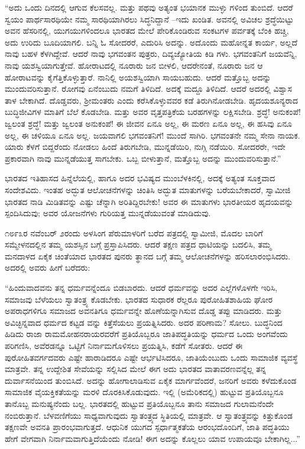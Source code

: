 “ಅದು ಒಂದು ದಿನದಲ್ಲಿ ಆಗುವ ಕೆಲಸವಲ್ಲ. ಮತ್ತು ಪಥವು ಅತ್ಯಂತ ಭಯಾನಕ ಮುಳ್ಳು ಗಳಿಂದ ತುಂಬಿದೆ. ಆದರೆ ಸ್ವಯಂ ಪಾರ್ಥಸಾರಥಿಯೇ ನಮ್ಮ ಸಾರಥಿಯಾಗಿರಲು ಸಿದ್ಧನಿದ್ದಾನೆ –ಇದು ಖಂಡಿತ. ಅವನಲ್ಲಿ ಅವಿಚಲ ಶ್ರದ್ಧೆಯಿಟ್ಟು ಅವನ ಹೆಸರಿನಲ್ಲಿ, ಯುಗಯುಗಳಿಂದಲೂ ಭಾರತದ ಮೇಲೆ ಪೇರಿಕೊಂಡಿರುವ ಸಂಕಟಗಳ ಪರ್ವತಕ್ಕೆ ಬೆಂಕಿ ಹಚ್ಚಿ, ಅದು ಉರಿದು ಬೂದಿಯಾಗಲಿ. ಬನ್ನಿ ಓ ಸೋದರರೆ, ಎದುರಿಸಿ ಅದನ್ನು. ಅದೊಂದು ಮಹೋನ್ನತ ಕಾರ್ಯ, ಅಲ್ಲದೆ ನಾವು ಬಹಳ ಕೆಳಗಿದ್ದೇವೆ. ಆದರೆ ನಾವು ಭಗವಂತನ ಪುತ್ರರು, ದಿವ್ಯಜ್ಯೋತಿಯ ಕಿಡಿ ಗಳು. ಭಗವಂತನಿಗೆ ಜಯವೆನ್ನಿ, ನಾವು ಯಶಸ್ವಿಯಾಗುತ್ತೇವೆ. ಹೋರಾಟದಲ್ಲಿ ನೂರಾರು ಜನ ಬೀಳಲಿ, ಆದರೇನಂತೆ, ನೂರಾರು ಜನ ಆ ಹೋರಾಟವನ್ನು ಕೈಗೆತ್ತಿಕೊಳ್ಳುತ್ತಾರೆ. ನಾನಿಲ್ಲಿ ಅಯಶಸ್ವಿಯಾಗಿ ಸಾಯಬಹುದು. ಆದರೆ ಮತ್ತೊಬ್ಬ ಅದನ್ನು ಮುಂದುವರಿಸುತ್ತಾನೆ. ರೋಗವು ಏನೆಂಬುದು ನಮಗೆ ತಿಳಿದಿದೆ. ಅದಕ್ಕೆ ಮದ್ದೂ ತಿಳಿದಿದೆ. ಆದರೆ ಅದರಲ್ಲಿ ವಿಶ್ವಾಸ ತಾಳ ಬೇಕಾಗಿದೆ. ದೊಡ್ಡವರು, ಶ್ರೀಮಂತರು ಎಂದು ಕರೆಸಿಕೊಳ್ಳುವವರ ಕಡೆ ತಿರುಗಿನೋಡಬೇಡಿ. ಹೃದಯಶೂನ್ಯರಾದ ಬುದ್ಧಿಜೀವಿಗಳ ಮಾತಿಗೆ ಬೆಲೆ ಕೊಡಬೇಡಿ. ಮತ್ತು ಅವರ ವೃತ್ತಪತ್ರಿಕೆಯ ಬರಹಗಳನ್ನು ಲಕ್ಷಿಸಬೇಡಿ. ಶ್ರದ್ಧೆ! ಅನುಕಂಪೆ! ಜ್ವಲಂತ ಶ್ರದ್ಧೆ! ಮತ್ತು ಜ್ವಲಂತ ಅನುಕಂಪೆ! ಈ ಜೀವನ ಏನೂ ಅಲ್ಲ, ಈ ಮರಣ ಏನೂ ಅಲ್ಲ, ಈ ಹಸಿವು ಏನೂ ಅಲ್ಲ, ಈ ಚಳಿಯೂ ಏನೂ ಅಲ್ಲ. ಜಯವಾಗಲಿ ಭಗವಂತನಿಗೆ! ಮುಂದೆ ಸಾಗಿರಿ. ಭಗವಂತನೇ ನಮ್ಮ ಸೇನಾ ನಾಯಕ. ಯಾರು ಕೆಳಗೆ ಬಿದ್ದರೆಂದು ನೋಡಲು ಹಿಂದೆ ತಿರುಗಬೇಡಿ, ಮುನ್ನಡೆಯಿರಿ, ನುಗ್ಗಿ ನಡೆಯಿರಿ. ಸೋದರರೇ, ಇದೇ ಪ್ರಕಾರವಾಗಿ ನಾವು ಮುನ್ನಡೆಯುತ್ತ ಸಾಗಬೇಕು. ಒಬ್ಬ ಬೀಳುತ್ತಾನೆ, ಮತ್ತೊಬ್ಬ ಅದನ್ನು ಮುಂದುವರಿಸುತ್ತಾನೆ.”

ಭಾರತದ ಇತಿಹಾಸದ ಹಿನ್ನೆಲೆಯಲ್ಲಿ, ಹಾಗೂ ಅದರ ಭವಿಷ್ಯದ ಮುಂಬೆಳಕಿನಲ್ಲಿ, ಅದಕ್ಕೆ ಅತ್ಯಂತ ಸೂಕ್ತವಾದ ಸಂದೇಶವಿದು. ಇಂತಹ ಅದ್ಭುತ ಆಲೋಚನೆಗಳನ್ನು ಚಿಂತಿಸಿ ಅದ್ಭುತ ಮಾತುಗಳನ್ನು ಬರೆಯಬೇಕಾದರೆ, ಸ್ವಾಮೀಜಿ ಭಾರತದ ನಾಡಿ ಮಿಡಿತವನ್ನು ಎಷ್ಟು ಚೆನ್ನಾಗಿ ಅರಿತಿದ್ದಿರಬೇಕು! ಅವರ ಈ ಮಾತುಗಳು ಭಾರತೀಯರ ಹೃದಯವನ್ನು ಸ್ಪಂದಿಸಿದುವು; ಅವರ ಯೋಜನೆಗಳು ಗುರಿಯತ್ತ ಮುನ್ನಡೆಯುವಂತೆ ಮಾಡಿದುವು.

೧೮೯೩ರ ನವೆಂಬರ್ ೨ರಂದು ಅಳಸಿಂಗ ಪೆರುಮಾಳರಿಗೆ ಬರೆದ ಪತ್ರದಲ್ಲಿ ಸ್ವಾಮೀಜಿ, ಮೊದಲ ಬಾರಿಗೆ ಸಮ್ಮೇಳನದಲ್ಲಿನ ತಮ್ಮ ಯಶಸ್ಸಿನ ಬಗ್ಗೆ ಪ್ರಸ್ತಾಪಿಸಿದರು. ಆದರೆ ತಕ್ಷಣ ಪತ್ರದ ಧಾಟಿಯನ್ನು ಬದಲಿಸಿ, ತಮ್ಮ ಮನದಾಳದ ಏಕೈಕ ಚಿಂತೆಯಾದ ಭಾರತದ ಪುನರು ತ್ಥಾನದ ಬಗ್ಗೆ ತಮ್ಮ ಆಲೋಚನೆಗಳನ್ನು ಹರಿಸಲಾರಂಭಿಸಿದರು. ಅದರಲ್ಲಿ ಅವರು ಹೀಗೆ ಬರೆದರು:

“ಹಿಂದುವಾದವನು ತನ್ನ ಧರ್ಮವನ್ನೆಂದೂ ಬಿಡಬಾರದು. ಆದರೆ ಧರ್ಮವನ್ನು ಅದರ ಎಲ್ಲೆಗಳೊಳಗೇ ಇರಿಸಿ, ಸಮಾಜವು ಬೆಳೆಯಲು ಸ್ವಾತಂತ್ರ್ಯ ಕೊಡಬೇಕು. ಭಾರತದ ಸುಧಾರಕ ರೆಲ್ಲರೂ ಪುರೋಹಿತಶಾಹಿಯ ಘೋರ ಅಪರಾಧಗಳಿಗೂ ಸಮಾಜದ ಅವನತಿಗೂ ಧರ್ಮವನ್ನೇ ಹೊಣೆಯನ್ನಾಗಿಸುವ ದೊಡ್ಡ ತಪ್ಪು ಮಾಡಿದರು. ಮತ್ತು ಅವಿಚ್ಛಿನ್ನವಾದ ಧರ್ಮದ ಕಟ್ಟಡ ವನ್ನು ಕಿತ್ತೆಸೆಯಲು ಪ್ರಯತ್ನಿಸಿದರು. ಅದರ ಪರಿಣಾಮ? ಸೋಲು. ಬುದ್ಧನಿಂದ ಹಿಡಿದು ರಾಜಾ ರಾಮಮೋಹನರಾಯರವರೆಗೆ ಪ್ರತಿಯೊಬ್ಬರೂ ಜಾತಿಪದ್ಧತಿಯನ್ನು ಧರ್ಮದ ಒಂದು ಅಂಗವೆಂದು ಪರಿಗಣಿಸಿ, ಅವೆರಡನ್ನೂ ಒಟ್ಟಿಗೆ ನಿರ್ನಾಮಗೊಳಿಸಲು ಪ್ರಯತ್ನಿಸಿ, ಕಡೆಗೆ ಸೋತರು. ಆದರೆ ಈ ಪುರೋಹಿತವರ್ಗದವರು ಎಷ್ಟೇ ಹಾರಾಡಿದರೂ ಎಷ್ಟೇ ಆರ್ಭಟಿಸಿದರೂ, ಜಾತಿಯೆಂಬುದು ಒಂದು ಸಾಮಾಜಿಕ ವ್ಯವಸ್ಥೆ ಮಾತ್ರವೇ. ತನ್ನ ಉದ್ದೇಶಿತ ಸೇವೆಯನ್ನು ಸಲ್ಲಿಸಿದ ಮೇಲೆ ಈಗ ಅದು ಭಾರತದ ವಾತಾವರಣವನ್ನೆಲ್ಲ ತನ್ನ ದುರ್ವಾಸನೆಯಿಂದ ತುಂಬಿಸಿದೆ. ಅದನ್ನು ಹೋಗಾಲಾಡಿಸುವ ಏಕೈಕ ಮಾರ್ಗವೆಂದರೆ, ಜನರಿಗೆ ಅವರು ಕಳೆದುಕೊಂಡ ಸಾಮಾಜಿಕ ವೈಯಕ್ತಿಕತೆಯನ್ನು ಮರಳಿ ದೊರಕಿಸಿಕೊಡುವುದು. ಇಲ್ಲಿ (ಅಮೆರಿಕದಲ್ಲಿ) ಹುಟ್ಟುವ ಪ್ರತಿಯೊಬ್ಬನೂ ತಾನೊಬ್ಬ ಮನುಷ್ಯನೆಂದು ಬಲ್ಲ. ಭಾರತದಲ್ಲಿ ಹುಟ್ಟುವ ಪ್ರತಿಯೊಬ್ಬನೂ ತಾನು ಸಮಾಜದ ಗುಲಾಮನೆಂದೇ ನಂಬಿರುತ್ತಾನೆ. ಬೆಳವಣಿಗೆಯು ಸಾಧ್ಯವಾಗುವುದು ಸ್ವಾತಂತ್ರ್ಯದ ಸ್ಥಿತಿಯಲ್ಲಿ ಮಾತ್ರವೇ. ಆ ಸ್ವಾತಂತ್ರ್ಯವನ್ನು ಕಿತ್ತುಕೊಂಡ ತಕ್ಷಣವೇ ಅವನತಿ ಪ್ರಾರಂಭವಾಗುತ್ತದೆ. ಆಧುನಿಕ ಯುಗದ ಸ್ಪರ್ಧಾತ್ಮಕತೆಯ ಆರಂಭದೊಂದಿಗೆ, ಜಾತಿ ಪದ್ಧತಿಯು ಹೇಗೆ ವೇಗವಾಗಿ ನಿರ್ನಾಮವಾಗುತ್ತಿದೆಯೆಂದು ನೋಡಿ! ಈಗ ಅದನ್ನು ಕೊಲ್ಲಲು ಯಾವ ಉಪಾಯವೂ ಬೇಕಾಗಿಲ್ಲ...”

